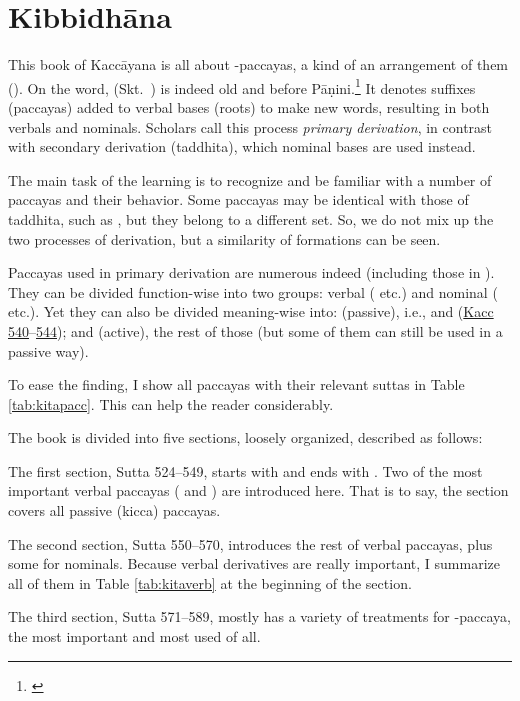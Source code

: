 \chapter{Kibbidhāna}

This book of Kaccāyana is all about -paccayas, a kind of an arrangement of them (). On the word,  (Skt.\ ) is indeed old and before Pāṇini.\footnote{\citealp[p.~126]{abhyankar:gramdict}} It denotes suffixes (paccayas) added to verbal bases (roots) to make new words, resulting in both verbals and nominals. Scholars call this process \emph{primary derivation}, in contrast with secondary derivation (taddhita), which nominal bases are used instead.

The main task of the learning is to recognize and be familiar with a number of paccayas and their behavior. Some paccayas may be identical with those of taddhita, such as , but they belong to a different set. So, we do not mix up the two processes of derivation, but a similarity of formations can be seen.

Paccayas used in primary derivation are numerous indeed (including those in ). They can be divided function-wise into two groups: verbal ( etc.) and nominal ( etc.). Yet they can also be divided meaning-wise into: \hyperref[sut:545]{} (passive), i.e.,  and  (\hyperref[sut:540]{Kacc 540}--\hyperref[sut:544]{544}); and \hyperref[sut:546]{} (active), the rest of those (but some of them can still be used in a passive way).

To ease the finding, I show all paccayas with their relevant suttas in Table \ref{tab:kitapacc}. This can help the reader considerably.

The book is divided into five sections, loosely organized, described as follows:

The first section, Sutta 524--549, starts with  and ends with . Two of the most important verbal paccayas ( and ) are introduced here. That is to say, the section covers all passive (kicca) paccayas.

The second section, Sutta 550--570, introduces the rest of verbal paccayas, plus some for nominals. Because verbal derivatives are really important, I summarize all of them in Table \ref{tab:kitaverb} at the beginning of the section.

The third section, Sutta 571--589, mostly has a variety of treatments for -paccaya, the most important and most used of all.

